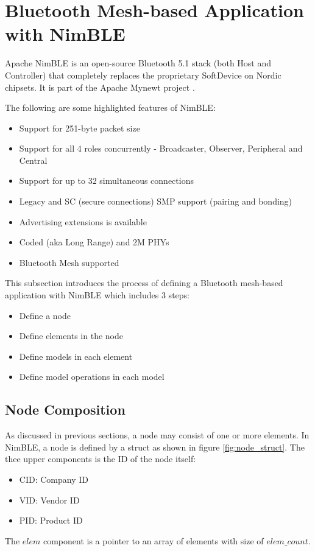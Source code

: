 \documentclass[\main/main.tex]{subfiles}
\begin{document}
\section{Bluetooth Mesh-based Application with NimBLE}
\label{sec:bluetooth_mesh_based_application_with_nimble}
Apache NimBLE is an open-source Bluetooth 5.1 stack (both Host and Controller) that completely replaces the proprietary SoftDevice on Nordic chipsets. It is part of the Apache Mynewt project \cite{web_nimble}.

The following are some highlighted features of NimBLE:
\begin{itemize}
    \item Support for 251-byte packet size
    \item Support for all 4 roles concurrently - Broadcaster, Observer, Peripheral and Central
    \item Support for up to 32 simultaneous connections
    \item Legacy and SC (secure connections) SMP support (pairing and bonding)
    \item Advertising extensions is available
    \item Coded (aka Long Range) and 2M PHYs
    \item Bluetooth Mesh supported
\end{itemize}

This subsection introduces the process of defining a Bluetooth mesh-based application with NimBLE which includes 3 steps:
\begin{itemize}
    \item Define a node
    \item Define elements in the node
    \item Define models in each element
    \item Define model operations in each model
\end{itemize}
\subsection{Node Composition}
As discussed in previous sections, a node may consist of one or more elements. In NimBLE, a node is defined by a struct as shown in figure \ref{fig:node_struct}. The thee upper components is the ID of the node itself:
\begin{itemize}
    \item CID: Company ID
    \item VID: Vendor ID
    \item PID: Product ID
\end{itemize}
The $elem$ component is a pointer to an array of elements with  size of $elem\_count$.
\end{document}
